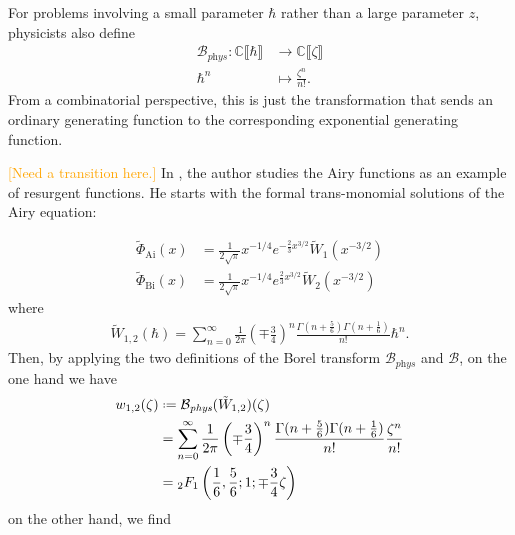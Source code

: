 \documentclass{article}
\newcommand{\maps}{\colon}
\newcommand{\C}{\mathbb{C}}
\newcommand*{\defeq}{\mathrel{\vcenter{\baselineskip0.5ex \lineskiplimit0pt
                     \hbox{\scriptsize.}\hbox{\scriptsize.}}}%
                     =}
\newcommand{\borel}{\mathcal{B}}
\theoremstyle{definition}
\theoremstyle{plain}
\begin{document}
For problems involving a small parameter $\hbar$ rather than a large parameter $z$, physicists also define
\begin{align*}
\borel_{\textit{phys}} \maps \C \llbracket \hbar \rrbracket & \to \C \llbracket \zeta \rrbracket \\
\hbar^n & \mapsto \frac{\zeta^n}{n!}.
\end{align*}
From a combinatorial perspective, this is just the transformation that sends an ordinary generating function to the corresponding exponential generating function.

\textcolor{orange}{[Need a transition here.]} In \cite{lectures-Marino}, the author studies the Airy functions as an example of resurgent functions. He starts with the formal trans-monomial solutions of the Airy equation:

\begin{align*}
\tilde{\Phi}_{\mathrm{Ai}}(x)&=\frac{1}{2\sqrt{\pi}}x^{-1/4}e^{-\tfrac{2}{3}x^{3/2}}\tilde{W}_1(x^{-3/2})\\
\tilde{\Phi}_{\mathrm{Bi}}(x)&=\frac{1}{2\sqrt{\pi}}x^{-1/4}e^{\tfrac{2}{3}x^{3/2}}\tilde{W}_2(x^{-3/2})
\end{align*}  
where 
\begin{align*}
\tilde{W}_{1,2}(\hbar)=\sum_{n=0}^{\infty}\frac{1}{2\pi}\left(\mp\frac{3}{4}\right)^{n}\frac{\Gamma(n+\frac{5}{6})\Gamma(n+\frac{1}{6})}{n!}\hbar^n.
\end{align*}
Then, by applying the two definitions of the Borel transform $\borel_{\textit{phys}}$ and $\borel$, on the one hand we have  
\begin{align*}
w_{1,2}(\zeta)&\defeq\borel_{\textit{phys}}(\tilde{W}_{1,2})(\zeta)\\
&=\sum_{n=0}^{\infty}\frac{1}{2\pi}\left(\mp\frac{3}{4}\right)^{n}\frac{\Gamma(n+\frac{5}{6})\Gamma(n+\frac{1}{6})}{n!}\frac{\zeta^n}{n!}\\
&={}_2F_1\left(\frac{1}{6},\frac{5}{6};1;\mp\frac{3}{4}\zeta\right) 
\end{align*}
on the other hand, we find
\end{document}
